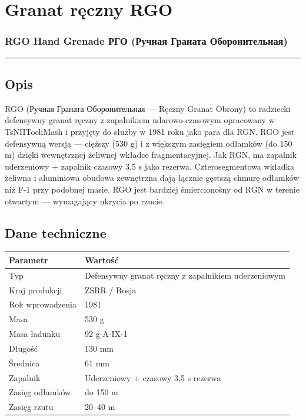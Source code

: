 \documentclass[12pt,openany,oneside]{book}
\begin{document}
\chapter{Granat ręczny RGO}\label{granat-rux119czny-rgo}

\subsection{RGO Hand Grenade \textbar{} РГО (Ручная Граната
Оборонительная)}\label{rgo-hand-grenade-ux440ux433ux43e-ux440ux443ux447ux43dux430ux44f-ux433ux440ux430ux43dux430ux442ux430-ux43eux431ux43eux440ux43eux43dux438ux442ux435ux43bux44cux43dux430ux44f}

\begin{center}\rule{0.5\linewidth}{0.5pt}\end{center}

\section{Opis}\label{opis-104}

RGO (Ручная Граната Оборонительная --- Ręczny Granat Obrony) to
radziecki defensywny granat ręczny z zapalnikiem udarowo-czasowym
opracowany w TsNIITochMash i przyjęty do służby w 1981 roku jako para
dla RGN. RGO jest defensywną wersją --- cięższy (530 g) i z większym
zasięgiem odłamków (do 150 m) dzięki wewnętrznej żeliwnej wkładce
fragmentacyjnej. Jak RGN, ma zapalnik uderzeniowy + zapalnik czasowy 3,5
s jako rezerwa. Czterosegmentowa wkładka żeliwna i aluminiowa obudowa
zewnętrzna dają łącznie gęstszą chmurę odłamków niż F-1 przy podobnej
masie. RGO jest bardziej śmiercionośny od RGN w terenie otwartym ---
wymagający ukrycia po rzucie.

\section{Dane techniczne}\label{dane-techniczne-104}

\begin{longtable}[]{@{}ll@{}}
\toprule\noalign{}
Parametr & Wartość \\
\midrule\noalign{}
\endhead
\bottomrule\noalign{}
\endlastfoot
Typ & Defensywny granat ręczny z zapalnikiem uderzeniowym \\
Kraj produkcji & ZSRR / Rosja \\
Rok wprowadzenia & 1981 \\
Masa & 530 g \\
Masa ładunku & 92 g A-IX-1 \\
Długość & 130 mm \\
Średnica & 61 mm \\
Zapalnik & Uderzeniowy + czasowy 3,5 s rezerwa \\
Zasięg odłamków & do 150 m \\
Zasięg rzutu & 20--40 m \\
\end{longtable}
\end{document}

